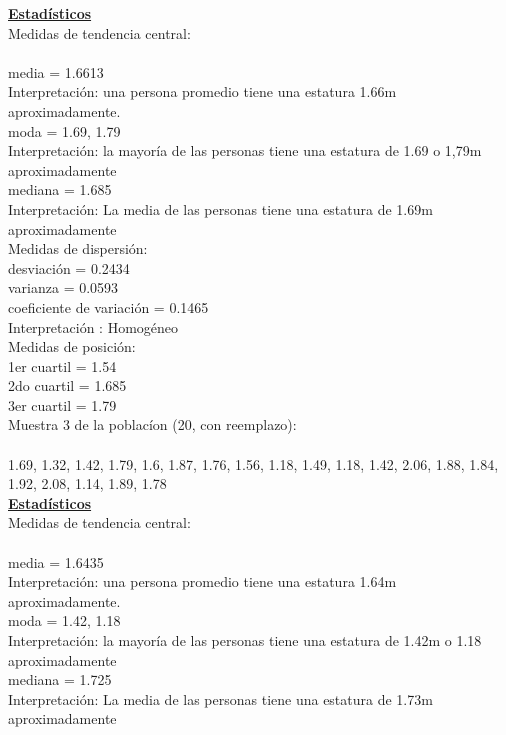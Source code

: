 \documentclass[a4paper,12pt]{article}
\begin{document}
\begin{enumerate}
\textbf{\underline{Estad\'isticos}} \\

Medidas de tendencia central:\\\\
media = 1.6613\\
Interpretaci\'on: una persona promedio tiene una estatura 1.66m aproximadamente.\\
moda = 1.69, 1.79\\
Interpretaci\'on: la mayor\'ia de las personas tiene una estatura de 1.69 o 1,79m aproximadamente\\
mediana = 1.685\\
Interpretaci\'on: La media de las personas tiene una estatura de 1.69m aproximadamente\\

Medidas de dispersi\'on:\\
desviaci\'on = 0.2434\\
varianza = 0.0593\\
coeficiente de variaci\'on = 0.1465\\
Interpretaci\'on : Homog\'eneo\\

Medidas de posici\'on:\\
1er cuartil = 1.54\\
2do cuartil = 1.685\\
3er cuartil = 1.79\\

\newpage
Muestra 3 de la poblac\'ion (20, con reemplazo): \\\\
1.69,	1.32,	1.42,	1.79,	1.6,    1.87,
1.76,	1.56,	1.18,	1.49,	1.18,	1.42,
2.06,	1.88,	1.84,	1.92,	2.08,	1.14,
1.89,	1.78\\

\textbf{\underline{Estad\'isticos}} \\

Medidas de tendencia central:\\\\
media = 1.6435\\
Interpretaci\'on: una persona promedio tiene una estatura 1.64m aproximadamente.\\
moda = 1.42, 1.18\\
Interpretaci\'on: la mayor\'ia de las personas tiene una estatura de 1.42m o 1.18 aproximadamente\\
mediana =  1.725\\
Interpretaci\'on: La media de las personas tiene una estatura de 1.73m aproximadamente\\


\end{enumerate}
\end{document}
